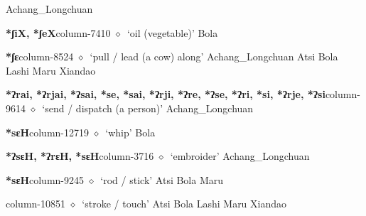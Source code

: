         Achang\_Longchuan 
  \item {\footnotesize \textbf{*ʃiX, *ʃeX}}{\tiny column-7410}
         $\diamond$~`oil (vegetable)'
         Bola 
  \item {\footnotesize \textbf{*ʃɛ}}{\tiny column-8524}
         $\diamond$~`pull / lead (a cow) along'
         Achang\_Longchuan 
\hspace{1ex}
         Atsi 
\hspace{1ex}
         Bola 
\hspace{1ex}
         Lashi 
\hspace{1ex}
         Maru 
\hspace{1ex}
         Xiandao 
  \item {\footnotesize \textbf{*ʔrai, *ʔrjai, *ʔsai, *se, *sai, *ʔrji, *ʔre, *ʔse, *ʔri, *si, *ʔrje, *ʔsi}}{\tiny column-9614}
         $\diamond$~`send / dispatch (a person)'
         Achang\_Longchuan 
  \item {\footnotesize \textbf{*sɛH}}{\tiny column-12719}
         $\diamond$~`whip'
         Bola 
  \item {\footnotesize \textbf{*ʔsɛH, *ʔrɛH, *sɛH}}{\tiny column-3716}
         $\diamond$~`embroider'
         Achang\_Longchuan 
  \item {\footnotesize \textbf{*sɛH}}{\tiny column-9245}
         $\diamond$~`rod / stick'
         Atsi 
\hspace{1ex}
         Bola 
\hspace{1ex}
         Maru 
  \item {\footnotesize \textbf{}}{\tiny column-10851}
         $\diamond$~`stroke / touch'
         Atsi 
\hspace{1ex}
         Bola 
\hspace{1ex}
         Lashi 
\hspace{1ex}
         Maru 
\hspace{1ex}
         Xiandao 
